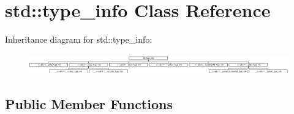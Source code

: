 \hypertarget{classstd_1_1type__info}{\section{std\+:\+:type\+\_\+info Class Reference}
\label{classstd_1_1type__info}
}
Inheritance diagram for std\+:\+:type\+\_\+info\+:\begin{figure}[H]
\begin{center}
\leavevmode
\includegraphics[height=0.888889cm]{classstd_1_1type__info}
\end{center}
\end{figure}
\subsection*{Public Member Functions}
